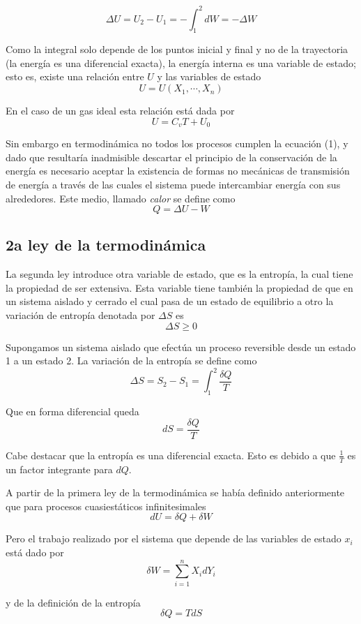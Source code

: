 \documentclass[a4paper,12pt]{article}
\begin{document}
\begin{equation}
	\Delta U = U_2 - U_1 = - \int_1^2 dW = -\Delta W 
\end{equation}

Como la integral solo depende de los puntos inicial y final y no de la trayectoria (la energía es una diferencial exacta), la energía interna es una variable de estado; esto es, existe una relación entre $U$ y las variables de estado
\[
	U = U(X_1, \cdots , X_n)
\]

En el caso de un gas ideal esta relación está dada por
\[
	U = C_v T + U_0
\]

Sin embargo en termodinámica no todos los procesos cumplen la ecuación (1), y dado que resultaría inadmisible descartar el principio de la conservación de la energía es necesario aceptar la existencia de formas no mecánicas de transmisión de energía a través de las cuales el sistema puede intercambiar energía con sus alrededores. Este medio, llamado \textit{calor} se define como
\[
	Q = \Delta U - W
\]

\subsection{2a ley de la termodinámica}
La segunda ley introduce otra variable de estado, que es la entropía, la cual tiene la propiedad de ser extensiva. Esta variable tiene también la propiedad de que en un sistema aislado y cerrado el cual pasa de un estado de equilibrio a otro la variación de entropía denotada por $\Delta S$ es
\[
	\Delta S \geq 0
\]

Supongamos un sistema aislado que efectúa un proceso reversible desde un estado 1 a un estado 2. La variación de la entropía se define como
\[
	\Delta S = S_2 - S_1 = \int_1^2 \frac{\delta Q}{T}
\]

Que en forma diferencial queda
\[
	d S = \frac{\delta Q}{T}
\]

Cabe destacar que la entropía es una diferencial exacta. Esto es debido a que $\frac{1}{T}$ es un factor integrante para $dQ$.

A partir de la primera ley de la termodinámica se había definido anteriormente que para procesos cuasiestáticos infinitesimales
\[
	d U = \delta Q + \delta W
\]

Pero el trabajo realizado por el sistema que depende de las variables de estado $x_i$ está dado por
\[
	\delta W = \sum_{i=1}^{n} X_i dY_i
\]

y de la definición de la entropía
\[
	\delta Q = T dS
\]
\end{document}
